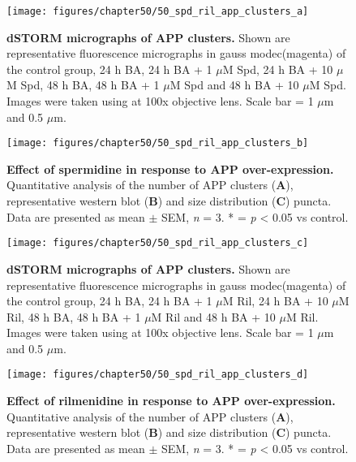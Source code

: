 \begin{landscape}
\begin{figure}[!htbp]
\center
  \texttt{[image: figures/chapter50/50\_spd\_ril\_app\_clusters\_a]}
  \caption[dSTORM micrographs of APP clusters]{\textbf{dSTORM micrographs of APP clusters.} Shown are representative fluorescence micrographs in gauss modec(magenta) of the control group, 24 h BA, 24 h BA + 1 $\mu$M Spd, 24 h BA + 10 $\mu$M Spd, 48 h BA, 48 h BA + 1 $\mu$M Spd and 48 h BA + 10 $\mu$M Spd. Images were taken using at 100x objective lens. Scale bar = 1 $\mu$m and 0.5 $\mu$m.}
  \label{fig:50_spd_ril_app_clusters_a}
\end{figure} 
\end{landscape}

\begin{landscape}
\begin{figure}[!htbp]
\center
  \texttt{[image: figures/chapter50/50\_spd\_ril\_app\_clusters\_b]}
  \caption[Effect of spermidine in response to APP over-expression]{\textbf{Effect of spermidine in response to APP over-expression.} Quantitative analysis of the number of APP clusters (\textbf{A}), representative western blot (\textbf{B}) and size distribution (\textbf{C}) puncta. Data are presented as mean $\pm$ SEM, \textit{n} = 3. * = \textit{p} < 0.05 vs control.}
  \label{fig:50_spd_ril_app_clusters_b}
\end{figure} 
\end{landscape}

\begin{landscape}
\begin{figure}[!htbp]
\center
  \texttt{[image: figures/chapter50/50\_spd\_ril\_app\_clusters\_c]}
  \caption[dSTORM micrographs of APP clusters]{\textbf{dSTORM micrographs of APP clusters.} Shown are representative fluorescence micrographs in gauss modec(magenta) of the control group, 24 h BA, 24 h BA + 1 $\mu$M Ril, 24 h BA + 10 $\mu$M Ril, 48 h BA, 48 h BA + 1 $\mu$M Ril and 48 h BA + 10 $\mu$M Ril. Images were taken using at 100x objective lens. Scale bar = 1 $\mu$m and 0.5 $\mu$m.}
  \label{fig:50_spd_ril_app_clusters_c}
\end{figure} 
\end{landscape}

\begin{landscape}
\begin{figure}[!htbp]
\center
  \texttt{[image: figures/chapter50/50\_spd\_ril\_app\_clusters\_d]}
  \caption[Effect of rilmenidine in response to APP over-expression]{\textbf{Effect of rilmenidine in response to APP over-expression.} Quantitative analysis of the number of APP clusters (\textbf{A}), representative western blot (\textbf{B}) and size distribution (\textbf{C}) puncta. Data are presented as mean $\pm$ SEM, \textit{n} = 3. * = \textit{p} < 0.05 vs control.}
  \label{fig:50_spd_ril_app_clusters_d}
\end{figure} 
\end{landscape}

